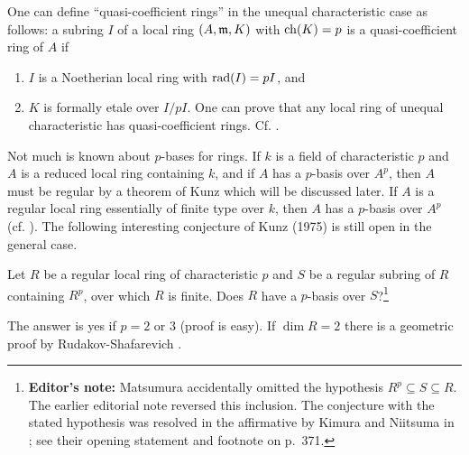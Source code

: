 \documentclass[../main]{subfiles}
\begin{document}
One can define ``quasi-coefficient rings'' in the unequal characteristic case as follows: a subring $I$ of a local ring $(A,\mathfrak{m},K)$ with $\operatorname{ch}(K) = p$ is a quasi-coefficient ring of $A$ if
\begin{enumerate}[label = (\arabic*)]
    \item $I$ is a Noetherian local ring with $\operatorname{rad}(I) = pI$, and
    \item $K$ is formally etale over $I/pI$. One can prove that any local ring of unequal characteristic has quasi-coefficient rings. Cf. \cite{matsumuranagoya1977}. 
\end{enumerate}

\newparagraph
Not much is known about $p$-bases for rings. If $k$ is a field of characteristic $p$ and $A$ is a reduced local ring containing $k$, and if $A$ has a $p$-basis over $A^p$, then $A$ must be regular by a theorem of Kunz which will be discussed later. If $A$ is a regular local ring essentially of finite type over $k$, then $A$ has a $p$-basis over $A^p$ (cf. \cite{kimurani1980regular}). The following interesting conjecture of Kunz (1975) is still open in the general case.
\begin{conjecture*}%
    Let $R$ be a regular local ring of characteristic $p$ and $S$ be a regular subring of $R$ containing $R^p$, over which $R$ is finite. Does $R$ have a $p$-basis over $S$?\footnote{\textbf{Editor's note:} Matsumura accidentally omitted the hypothesis $R^p\subseteq S\subseteq R$. The earlier editorial note reversed this inclusion. The conjecture with the stated hypothesis was resolved in the affirmative by Kimura and Niitsuma in \cite{kimuraniitsuma1982}; see their opening statement and footnote on p.~371.}
\end{conjecture*}
The answer is yes if $p=2$ or 3 (proof is easy). If $\dim R = 2$ there is a geometric proof by Rudakov-Shafarevich \cite{rudakovshafarevich1976}.
\end{document}
